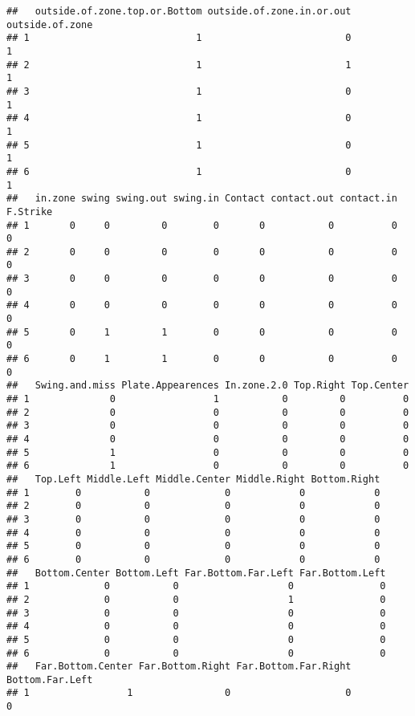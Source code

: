 \documentclass[]{article}
\begin{document}
\begin{verbatim}
##   outside.of.zone.top.or.Bottom outside.of.zone.in.or.out outside.of.zone
## 1                             1                         0               1
## 2                             1                         1               1
## 3                             1                         0               1
## 4                             1                         0               1
## 5                             1                         0               1
## 6                             1                         0               1
##   in.zone swing swing.out swing.in Contact contact.out contact.in F.Strike
## 1       0     0         0        0       0           0          0        0
## 2       0     0         0        0       0           0          0        0
## 3       0     0         0        0       0           0          0        0
## 4       0     0         0        0       0           0          0        0
## 5       0     1         1        0       0           0          0        0
## 6       0     1         1        0       0           0          0        0
##   Swing.and.miss Plate.Appearences In.zone.2.0 Top.Right Top.Center
## 1              0                 1           0         0          0
## 2              0                 0           0         0          0
## 3              0                 0           0         0          0
## 4              0                 0           0         0          0
## 5              1                 0           0         0          0
## 6              1                 0           0         0          0
##   Top.Left Middle.Left Middle.Center Middle.Right Bottom.Right
## 1        0           0             0            0            0
## 2        0           0             0            0            0
## 3        0           0             0            0            0
## 4        0           0             0            0            0
## 5        0           0             0            0            0
## 6        0           0             0            0            0
##   Bottom.Center Bottom.Left Far.Bottom.Far.Left Far.Bottom.Left
## 1             0           0                   0               0
## 2             0           0                   1               0
## 3             0           0                   0               0
## 4             0           0                   0               0
## 5             0           0                   0               0
## 6             0           0                   0               0
##   Far.Bottom.Center Far.Bottom.Right Far.Bottom.Far.Right Bottom.Far.Left
## 1                 1                0                    0               0

\end{verbatim}
\end{document}
